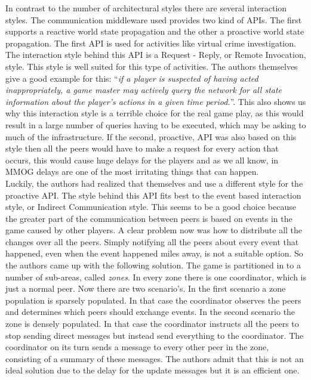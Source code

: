In contrast to the number of architectural styles there are several interaction styles. 
The communication middleware used provides two kind of APIs. 
The first supports a reactive world state propagation and the other a proactive world state propagation. 
The first API is used for activities like virtual crime investigation. 
The interaction style behind this API is a Request - Reply, or Remote Invocation, style. 
This style is well suited for this type of activities. 
The authors themselves give a good example for this: ``\emph{if a player is suspected of having acted inappropriately, a game master may actively query the network for all state information about the player's actions in a given time period.}''. 
This also shows us why this interaction style is a terrible choice for the real game play, as this would result in a large number of queries having to be executed, which may be asking to much of the infrastructure.
If the second, proactive, API was also based on this style then all the peers would have to make a request for every action that occurs, this would cause huge delays for the players and as we all know, in MMOG delays are one of the most irritating things that can happen.\\

Luckily, the authors had realized that themselves and use a different style for the proactive API.
The style behind this API fits best to the event based interaction style, or Indirect Communication style. 
This seems to be a good choice because the greater part of the communication between peers is based on events in the game caused by other players. 
A clear problem now was how to distribute all the changes over all the peers. 
Simply notifying all the peers about every event that happened, even when the event happened miles away, is not a suitable option. 
So the authors came up with the following solution. 
The game is partitioned in to a number of sub-areas, called \emph{zones}. 
In every zone there is one coordinator, which is just a normal peer. 
Now there are two scenario's. 
In the first scenario a zone population is sparsely populated. 
In that case the coordinator observes the peers and determines which peers should exchange events. 
In the second scenario the zone is densely populated. 
In that case the coordinator instructs all the peers to stop sending direct messages but instead send everything to the coordinator. 
The coordinator on its turn sends a message to every other peer in the zone, consisting of a summary of these messages. 
The authors admit that this is not an ideal solution due to the delay for the update messages but it is an efficient one.\\

